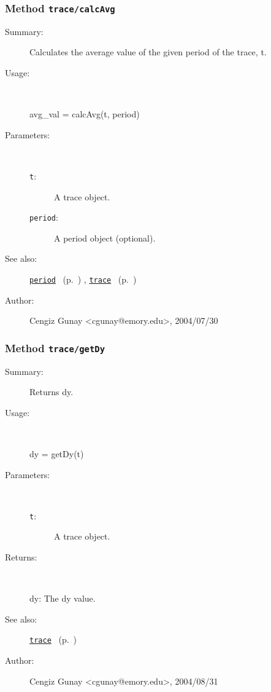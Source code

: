 \subsubsection[Method \texttt{calcAvg}]{Method \texttt{trace/calcAvg}}%
%
\label{ref_trace__calcAvg}%
\hypertarget{ref_trace__calcAvg}{}%
\begin{description}
\item[Summary:]Calculates the average value of the given period 
 		of the trace, t. 
%
\item[Usage:]~%
\begin{lyxcode}%
avg\_val = calcAvg(t, period)
%
\end{lyxcode}%
%
%
\item[Parameters:]~
\begin{description}%
\item[\texttt{t}:]
 A trace object.
\item[\texttt{period}:]
 A period object (optional).
\end{description}%
%
%
%
\item[See also:]%
\hyperlink{ref_period}{\texttt{period}}%
\ (p.~\pageref{ref_period})%
%
, \hyperlink{ref_trace}{\texttt{trace}}%
\ (p.~\pageref{ref_trace})%
%
%
\item[Author:]%
Cengiz Gunay <cgunay@emory.edu>, 2004/07/30%
\end{description}
\methodline%
\subsubsection[Method \texttt{getDy}]{Method \texttt{trace/getDy}}%
%
\label{ref_trace__getDy}%
\hypertarget{ref_trace__getDy}{}%
\begin{description}
\item[Summary:]Returns dy.
%
\item[Usage:]~%
\begin{lyxcode}%
dy = getDy(t)
%
\end{lyxcode}%
%
%
\item[Parameters:]~
\begin{description}%
\item[\texttt{t}:]
 A trace object.
\end{description}%
%
\item[Returns:]~

	dy: The dy value.
%
%
\item[See also:]%
\hyperlink{ref_trace}{\texttt{trace}}%
\ (p.~\pageref{ref_trace})%
%
%
\item[Author:]%
Cengiz Gunay <cgunay@emory.edu>, 2004/08/31%
\end{description}
\methodline%
